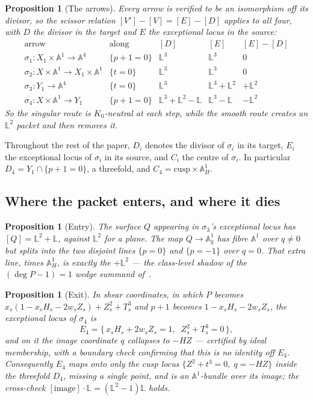 \documentclass[11pt]{article}
\newtheorem{proposition}[theorem]{Proposition}
\theoremstyle{definition}
\theoremstyle{remark}
\newcommand{\Aff}[1]{\mathbb{A}^{#1}}
\newcommand{\Lef}{\mathbb{L}}
\begin{document}
\begin{proposition}[The arrows]\label{prop:arrows}
Every arrow is verified to be an isomorphism off its divisor, so the scissor
relation $[V']-[V]=[E]-[D]$ applies to all four, with $D$ the divisor in the
target and $E$ the exceptional locus in the source:
\[
\begin{array}{l|l|ccc}
\text{arrow} & \text{along} & [D] & [E] & [E]-[D]\\\hline
\sigma_1\colon X_1\times\Aff{1}\to\Aff{4} & \{p+1=0\} & \Lef^3 & \Lef^3 & 0\\
\sigma_2\colon X\times\Aff{1}\to X_1\times\Aff{1} & \{t=0\} & \Lef^3 &
\Lef^3 & 0\\
\sigma_3\colon Y_1\to\Aff{4} & \{t=0\} & \Lef^3 & \Lef^3+\Lef^2 & +\Lef^2\\
\sigma_4\colon X\times\Aff{1}\to Y_1 & \{p+1=0\} & \Lef^3+\Lef^2-\Lef &
\Lef^3-\Lef & -\Lef^2
\end{array}
\]
So the singular route is $K_0$-neutral at each step, while the smooth route
creates an $\Lef^2$ packet and then removes it.
\end{proposition}

Throughout the rest of the paper, $D_i$ denotes the divisor of $\sigma_i$ in
its target, $E_i$ the exceptional locus of $\sigma_i$ in its source, and $C_i$
the centre of $\sigma_i$. In particular $D_4=Y_1\cap\{p+1=0\}$, a threefold,
and $C_4=\text{cusp}\times\Aff{1}_H$.

\subsection{Where the packet enters, and where it dies}

\begin{proposition}[Entry]\label{prop:entry}
The surface $Q$ appearing in $\sigma_3$'s exceptional locus has
$[Q]=\Lef^2+\Lef$, against $\Lef^2$ for a plane. The map $Q\to\Aff{1}_q$ has
fibre $\Aff{1}$ over $q\ne0$ but splits into the \emph{two disjoint lines}
$\{p=0\}$ and $\{p=-1\}$ over $q=0$. That extra line, times $\Aff{1}_H$, is
exactly the $+\Lef^2$ --- the class-level shadow of the $(\deg P-1)=1$ wedge
summand of~\cite{ADO2021}.
\end{proposition}

\begin{proposition}[Exit]\label{prop:exit}
In shear coordinates, in which $P$ becomes
$x_s(1-x_sH_s-2w_sZ_s)+Z_s^2+T_s^3$ and $p+1$ becomes $1-x_sH_s-2w_sZ_s$, the
exceptional locus of $\sigma_4$ is
\[
E_4=\{\,x_sH_s+2w_sZ_s=1,\;\;Z_s^2+T_s^3=0\,\},
\]
and on it the image coordinate $q$ collapses to $-HZ$ --- certified by ideal
membership, with a boundary check confirming that this is no identity off
$E_4$. Consequently $E_4$ maps onto only the cusp locus
$\{Z^2+t^3=0,\;q=-HZ\}$ inside the threefold $D_4$, \emph{missing a single
point}, and is an $\Aff{1}$-bundle over its image; the cross-check
$[\text{image}]\cdot\Lef=(\Lef^2-1)\Lef$ holds.
\end{proposition}
\end{document}
